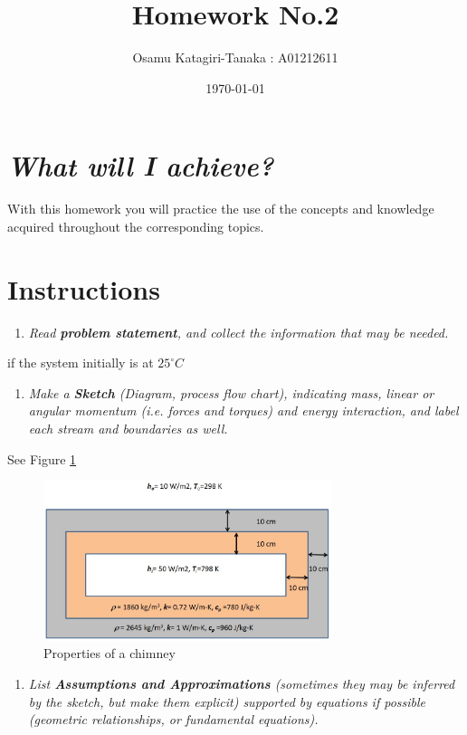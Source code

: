 \documentclass{article}
\title{Homework No.2}
\author{Osamu Katagiri-Tanaka : A01212611}
\date{\today}
\begin{document}
\maketitle

\section*{\emph{What will I achieve?}}
With this homework you will practice the use of the concepts and knowledge acquired throughout the corresponding topics.

\section*{Instructions}

\begin{enumerate}
\item \textit{Read \textbf{problem statement}, and collect the information that may be needed.}
\end{enumerate}

if the system initially is at $25^\circ C$

\begin{enumerate}[resume]
\item \textit{Make a \textbf{Sketch} (Diagram, process flow chart), indicating mass, linear or angular momentum (i.e. forces and torques) and energy interaction, and label each stream and boundaries as well.}
\end{enumerate}

See Figure \ref{fig_SKETCH}

\begin{figure}[h!]
\centering
\includegraphics[width=0.75\textwidth]{./img/SKETCH.png}
\caption{Properties of a chimney}
\label{fig_SKETCH}
\end{figure}

\begin{enumerate}[resume]
\item \textit{List \textbf{Assumptions and Approximations} (sometimes they may be inferred by the sketch, but make them explicit) supported by equations if possible (geometric relationships, or fundamental equations).}
\end{enumerate}
\end{document}
